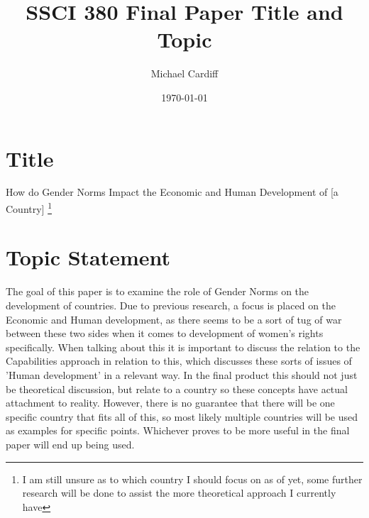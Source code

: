 \documentclass[12pt]{article}
\title{SSCI 380 Final Paper Title and Topic}
\author{Michael Cardiff}
\date{\today}
\begin{document}
\maketitle

\section{Title}
How do Gender Norms Impact the Economic and Human Development of [a Country] \footnote{I am still unsure as to which country I should focus on as of yet, some further research will be done to assist the more theoretical approach I currently have}

\section{Topic Statement}
The goal of this paper is to examine the role of Gender Norms on the development of countries. Due to previous research, a focus is placed on the Economic and Human development, as there seems to be a sort of tug of war between these two sides when it comes to development of women's rights specifically. When talking about this it is important to discuss the relation to the Capabilities approach in relation to this, which discusses these sorts of issues of 'Human development' in a relevant way. In the final product this should not just be theoretical discussion, but relate to a country so these concepts have actual attachment to reality. However, there is no guarantee that there will be one specific country that fits all of this, so most likely multiple countries will be used as examples for specific points. Whichever proves to be more useful in the final paper will end up being used. 


 
\end{document}
